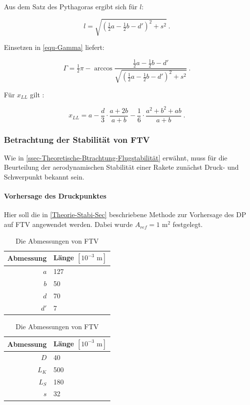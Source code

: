\documentclass[10pt,a4paper]{article}
\begin{document}
\noindent
Aus dem Satz des Pythagoras ergibt sich für $l$:

\[ l = \sqrt{\left(\tfrac{1}{2}a-\tfrac{1}{2}b-d'\right) ^{2}+s^{2}} \ .\]

\noindent
Einsetzen in \eqref{equ-Gamma} liefert:

\begin{equation}
\Gamma = \tfrac{1}{2}\pi - \arccos \dfrac{\tfrac{1}{2}a - \tfrac{1}{2}b - d' }   {\sqrt{\left(\tfrac{1}{2}a-\tfrac{1}{2}b-d'\right) ^{2}+s^{2}}} \ .
\label{equ-Gamma-Vollständig}
\end{equation}

\noindent
Für $x_{LL}$ gilt \cite{sn}:

\begin{equation}
x_{LL} = a - \frac{d}{3} \cdot \frac{a+2b}{a+b} - \frac{1}{6} \cdot \frac{a^{2}+b^{2}+ab} {a+b} \ .
\end{equation}


\subsubsection{Betrachtung der Stabilität von FTV}

Wie in \ref{ssec-Theoretische-Btrachtung-Flugstabilität} erwähnt, muss für die Beurteilung der aerodynamischen Stabilität einer Rakete zunächst Druck- und Schwerpunkt bekannt sein.

\paragraph{Vorhersage des Druckpunktes}
Hier soll die in \ref{Theorie-Stabi-Sec} beschriebene Methode zur Vorhersage des DP auf FTV angewendet werden. Dabei wurde $A_{ref} = 1 \text{ m}^{2}$ festgelegt.

\begin{table}[H]
\caption{Die Abmessungen von FTV}
\centering
\begin{subtable}[c]{.35\textwidth}
	\begin{tabular}{r|l}
	\toprule
	Abmessung	& Länge $[10^{-3} \text{ m}]$\\
	\midrule
	$a$			& 127	\\
	$b$			& 50	\\
	$d$			& 70	\\
	$d'$		& 7		\\
	\bottomrule
	\end{tabular}
\end{subtable}
\begin{subtable}[c]{.35\textwidth}
	\begin{tabular}{r|l}
	\toprule
	Abmessung	& Länge $[10^{-3} \text{ m}]$\\
	\midrule
	$D$			& 40	\\
	$L_{K}$		& 500	\\
	$L_{S}$		& 180	\\
	$s$			& 32	\\
	\bottomrule
	\end{tabular}
\end{subtable}
\label{Abmessungen-Tab}
\end{table}
\end{document}
